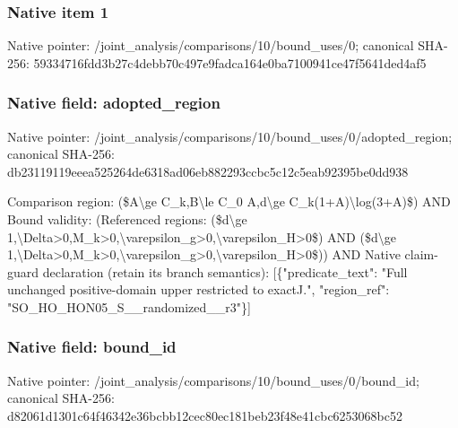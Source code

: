 \documentclass[10pt,a4paper]{article}
\begin{document}
\subsubsection{Native item 1}
Native pointer: /joint\_\allowbreak{}analysis/comparisons/10/bound\_\allowbreak{}uses/0; canonical SHA-256: 59334716fdd3b27c4debb70c497e9fadca164e0ba7100941ce47f5641ded4af5

\subsubsection{Native field: adopted\_\allowbreak{}region}
Native pointer: /joint\_\allowbreak{}analysis/comparisons/10/bound\_\allowbreak{}uses/0/adopted\_\allowbreak{}region; canonical SHA-256: db23119119eeea525264de6318ad06eb882293ccbc5c12c5eab92395be0dd938

\begingroup\raggedright\sloppy Comparison region:\allowbreak{} (\$A\textbackslash{}ge C\_\allowbreak{}k,\allowbreak{}B\textbackslash{}le C\_\allowbreak{}0 A,\allowbreak{}d\textbackslash{}ge C\_\allowbreak{}k(1+A)\textbackslash{}log(3+A)\$) AND Bound validity:\allowbreak{} (Referenced regions:\allowbreak{} (\$d\textbackslash{}ge 1,\allowbreak{}\textbackslash{}Delta>0,\allowbreak{}M\_\allowbreak{}k>0,\allowbreak{}\textbackslash{}varepsilon\_\allowbreak{}g>0,\allowbreak{}\textbackslash{}varepsilon\_\allowbreak{}H>0\$) AND (\$d\textbackslash{}ge 1,\allowbreak{}\textbackslash{}Delta>0,\allowbreak{}M\_\allowbreak{}k>0,\allowbreak{}\textbackslash{}varepsilon\_\allowbreak{}g>0,\allowbreak{}\textbackslash{}varepsilon\_\allowbreak{}H>0\$)) AND Native claim-guard declaration (retain its branch semantics):\allowbreak{} [\{"predicate\_\allowbreak{}text":\allowbreak{} "Full unchanged positive-domain upper restricted to exactJ.",\allowbreak{} "region\_\allowbreak{}ref":\allowbreak{} "SO\_\allowbreak{}HO\_\allowbreak{}HON05\_\allowbreak{}S\_\allowbreak{}\_\allowbreak{}randomized\_\allowbreak{}\_\allowbreak{}r3"\}]\par\endgroup

\subsubsection{Native field: bound\_\allowbreak{}id}
Native pointer: /joint\_\allowbreak{}analysis/comparisons/10/bound\_\allowbreak{}uses/0/bound\_\allowbreak{}id; canonical SHA-256: d82061d1301c64f46342e36bcbb12cec80ec181beb23f48e41cbc6253068bc52
\end{document}
